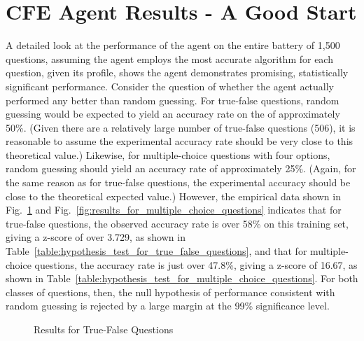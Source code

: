 \section{CFE Agent Results - A Good Start}

A detailed look at the performance of the agent on the entire battery of 1,500 questions, assuming the agent employs the most accurate algorithm for each question, given its profile, shows the agent demonstrates promising, statistically significant performance.  Consider the question of whether the agent actually performed any better than random guessing.  For true-false questions, random guessing would be expected to yield an accuracy rate on the of approximately 50\%.  (Given there are a relatively large number of true-false questions (506), it is reasonable to assume the experimental accuracy rate should be very close to this theoretical value.)  Likewise, for multiple-choice questions with four options, random guessing should yield an accuracy rate of approximately 25\%.  (Again, for the same reason as for true-false questions, the experimental accuracy should be close to the theoretical expected value.)  However, the empirical data shown in Fig.~\ref{fig:results_for_true_false_questions} and Fig.~\ref{fig:results_for_multiple_choice_questions} indicates that for true-false questions, the observed accuracy rate is over 58\% on this training set, giving a z-score of over 3.729, as shown in Table~\ref{table:hypothesis_test_for_true_false_questions}, and that for multiple-choice questions, the accuracy rate is just over 47.8\%, giving a z-score of 16.67, as shown in Table~\ref{table:hypothesis_test_for_multiple_choice_questions}.  For both classes of questions, then, the null hypothesis of performance consistent with random guessing is rejected by a large margin at the 99\% significance level.  


\begin{figure}
\centering
{}
\caption{Results for True-False Questions}
\label{fig:results_for_true_false_questions}
\end{figure}

